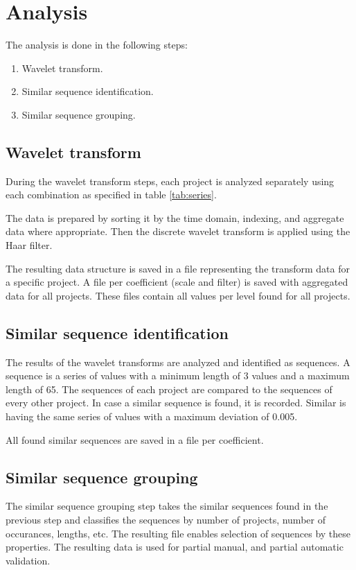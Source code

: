 \section{Analysis}
The analysis is done in the following steps:
\begin{enumerate}
	\item Wavelet transform.
	\item Similar sequence identification.
	\item Similar sequence grouping.
\end{enumerate}

\subsection{Wavelet transform}
During the wavelet transform steps, each project is analyzed separately using
each combination as specified in table \ref{tab:series}.

The data is prepared by sorting it by the time domain, indexing, and aggregate
data where appropriate. Then the discrete wavelet transform is applied using the
Haar filter.

The resulting data structure is saved in a file representing the transform data
for a specific project. A file per coefficient (scale and filter) is saved
with aggregated data for all projects. These files contain all values per level
found for all projects.

\subsection{Similar sequence identification}
The results of the wavelet transforms are analyzed and identified as sequences.
A sequence is a series of values with a minimum length of 3 values and a maximum
length of 65. The sequences of each project are compared to the sequences of
every other project. In case a similar sequence is found, it is recorded.
Similar is having the same series of values with a maximum deviation of
0.005.

All found similar sequences are saved in a file per coefficient.

\subsection{Similar sequence grouping}
The similar sequence grouping step takes the similar sequences found in the
previous step and classifies the sequences by number of projects, number of
occurances, lengths, etc. The resulting file enables selection of sequences by
these properties. The resulting data is used for partial manual, and partial
automatic validation.


